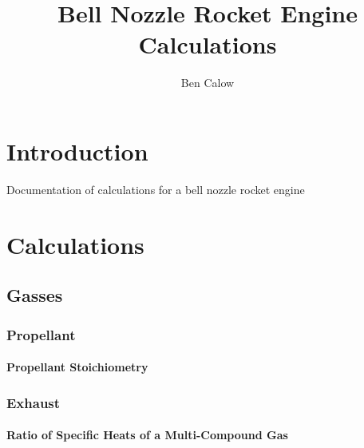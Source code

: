 \documentclass{article}
\title{Bell Nozzle Rocket Engine Calculations}
\author{Ben Calow}
\begin{document}
\clearpage\maketitle
\thispagestyle{empty}

\pagebreak

\setcounter{page}{1}

\tableofcontents

\pagebreak

\begingroup
\begin{center}
\end{center}
\endgroup

\pagebreak

\section{Introduction}

Documentation of calculations for a bell nozzle rocket engine

\pagebreak

\section{Calculations}

\subsection{Gasses}

\subsubsection{Propellant}

\paragraph{Propellant Stoichiometry}



\subsubsection{Exhaust}

\paragraph{Ratio of Specific Heats of a Multi-Compound Gas}
\end{document}
